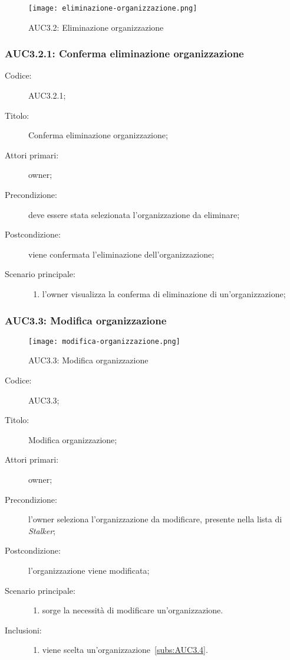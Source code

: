 \documentclass[../../../analisi-dei-requisiti.tex]{subfiles}
\begin{document}
\begin{figure}[H]
  \centering
  \texttt{[image: eliminazione-organizzazione.png]}
  \caption{AUC3.2: Eliminazione organizzazione}%
  \label{fig:AUC3.2}
\end{figure}

\subsubsection{AUC3.2.1: Conferma eliminazione organizzazione}%
\label{subs:AUC3.2.1}
\begin{description}
  \item[Codice:] AUC3.2.1;
  \item[Titolo:] Conferma eliminazione organizzazione;
  \item[Attori primari:] owner;
  \item[Precondizione:] deve essere stata selezionata l'organizzazione da eliminare;
  \item[Postcondizione:] viene confermata l'eliminazione dell'organizzazione;
  \item[Scenario principale:]
        \begin{enumerate}
          \item l'owner visualizza la conferma di eliminazione di un'organizzazione;
        \end{enumerate}
\end{description}

\subsubsection{AUC3.3: Modifica organizzazione}%
\label{subs:AUC3.3}

\begin{figure}[H]
  \centering
  \texttt{[image: modifica-organizzazione.png]}
  \caption{AUC3.3: Modifica organizzazione}%
  \label{fig:AUC3_3}
\end{figure}

\begin{description}
  \item[Codice:] AUC3.3;
  \item[Titolo:] Modifica organizzazione;
  \item[Attori primari:] owner;
  \item[Precondizione:] l'owner seleziona l'organizzazione da modificare, presente nella lista di \emph{Stalker};
  \item[Postcondizione:] l'organizzazione viene modificata;
  \item[Scenario principale:]
        \begin{enumerate}
          \item sorge la necessità di modificare un'organizzazione.
        \end{enumerate}
  \item[Inclusioni:]
        \begin{enumerate}
          \item viene scelta un'organizzazione~\ref{subs:AUC3.4}.
        \end{enumerate}
\end{description}
\end{document}

